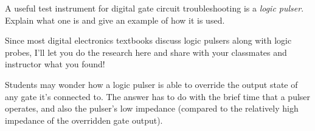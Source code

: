 

A useful test instrument for digital gate circuit troubleshooting is a {\it logic pulser}.  Explain what one is and give an example of how it is used.







Since most digital electronics textbooks discuss logic pulsers along with logic probes, I'll let you do the research here and share with your classmates and instructor what you found!







Students may wonder how a logic pulser is able to override the output state of any gate it's connected to.  The answer has to do with the brief time that a pulser operates, and also the pulser's low impedance (compared to the relatively high impedance of the overridden gate output).




